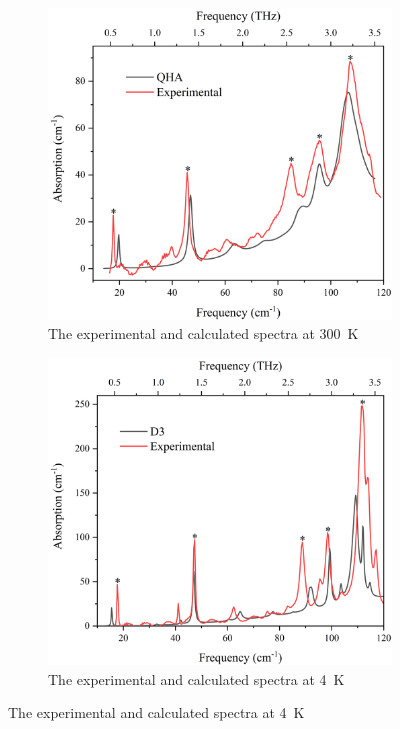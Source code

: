 \begin{figure}
\centering

\begin{subfigure}{0.49\textwidth}
\centering
\includegraphics[width=\textwidth]{Figures/Spectra/RTEvsCG.png}
\caption{The experimental and calculated spectra at \SI{300}{K}}
\label{fig:RTvsEXP300K}
\end{subfigure}
\begin{subfigure}{0.49\textwidth}
\centering
\includegraphics[width=\textwidth]{Figures/Spectra/D3ExpDiffG.png}
\caption{The experimental and calculated spectra at \SI{4}{K}}
\label{fig:RTvsEXP4K}
\end{subfigure}


\end{figure}

